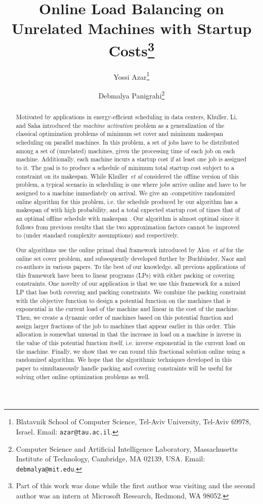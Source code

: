 \documentclass[11pt]{article}
\title{Online Load Balancing on Unrelated Machines with Startup Costs\thanks{Part
of this work was done while the first author was visiting and the
second author was an intern at Microsoft Research, Redmond, WA 98052.}}
\author{Yossi Azar\thanks{
Blatavnik School of Computer Science,
Tel-Aviv University, Tel-Aviv 69978, Israel. Email: {\tt azar@tau.ac.il}.}
\and Debmalya Panigrahi\thanks{
Computer Science and Artificial Intelligence Laboratory,
Massachusetts Institute of Technology,
Cambridge, MA 02139, USA. Email: {\tt debmalya@mit.edu}.}}
\date{}
\begin{document}
\maketitle

\thispagestyle{empty}

\begin{abstract}
Motivated by applications in energy-efficient scheduling in data 
centers, Khuller, Li, and Saha introduced the {\em machine activation} problem 
as a generalization of the classical optimization problems of minimum set cover 
and minimum makespan scheduling on parallel machines. 
In this problem, a set of  jobs
have to be distributed among a set of  (unrelated) machines, given the
processing time of each job on each machine. Additionally, each machine incurs
a startup cost if at least one job is assigned to it. 
The goal is to produce a schedule of minimum total
startup cost subject to a constraint  on its makespan.
While Khuller~{\em et al} considered the offline version of this problem, 
a typical scenario in scheduling is one where jobs arrive online and 
have to be assigned to a machine immediately on arrival. 
We give an -competitive randomized online algorithm
for this problem, i.e. the schedule produced by our algorithm has 
a makespan of  with high probability, and a total expected 
startup cost of 
 times that of an optimal offline schedule with makespan 
. Our algorithm is almost optimal since it follows from previous results
that the two approximation factors cannot be improved to  
(under standard complexity assumptions) and  respectively. 

Our algorithms use the online primal dual framework introduced by 
Alon~{\em et al} for the online set cover problem, and subsequently developed 
further by Buchbinder, Naor and co-authors in various papers. To the best of 
our knowledge, all previous applications of this framework have been to 
linear programs (LPs) with either packing or covering constraints. One 
novelty of our application is that we use this framework for a mixed LP that 
has both covering and packing constraints. We combine the packing constraint with
the objective function to design a potential function on the machines that is exponential
in the current load of the machine and linear in the cost of the machine.
Then, we create a dynamic order of machines based on this potential function and
assign larger fractions of the job to machines that appear earlier in this 
order. This allocation is somewhat unusual in that
the increase in load on a machine is inverse in the 
value of this potential function itself, i.e. inverse exponential in the
current load on the machine. Finally, we show that we can round
this fractional solution online using a randomized algorithm. 
We hope that the algorithmic 
techniques developed in this paper to simultaneously handle packing and
covering constraints will be useful for solving other online optimization 
problems as well. 

\end{abstract}
\end{document}
